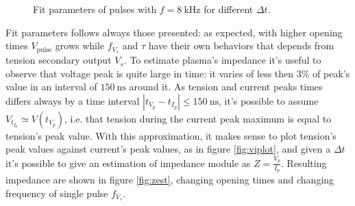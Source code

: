 \begin{figure}
 \centering
 
 \caption{Fit parameters of pulses with $f=\SI{8}{\kilo\hertz}$ for different $\Delta t$.}
 \label{fig:parexp}
\end{figure}

Fit parameters follows always those presented: as expected, with higher opening times $ V_{\text{pulse}} $ grows while $f_{V_{s}}$ and $\tau$ have their own behaviors that depends from tension secondary output $V_s$.
To estimate plasma's impedance it's useful to observe that voltage peak is quite large in time: it varies of less then $3\%$ of peak's value in an interval of $\SI{150}{\nano\second}$ around it. As tension and current peaks times differs always by a time interval $|t_{V_p} - t_{I_p}| \leq \SI{150}{\nano\second}$, it's possible to assume $V_{t_{I_p}} \simeq V(t_{V_p})$, i.e. that tension during the current peak maximum is equal to tension's peak value. With this approximation, it makes sense to plot tension's peak values against current's peak values, as in figure \ref{fig:viplot}, and given a $\Delta t$ it's possible to give an estimation of impedance module as $Z = \frac{V_{p}}{I_{p}}$. Resulting impedance are shown in figure \ref{fig:zest}, changing opening times and changing frequency of single pulse $f_{V_{s}}$.

